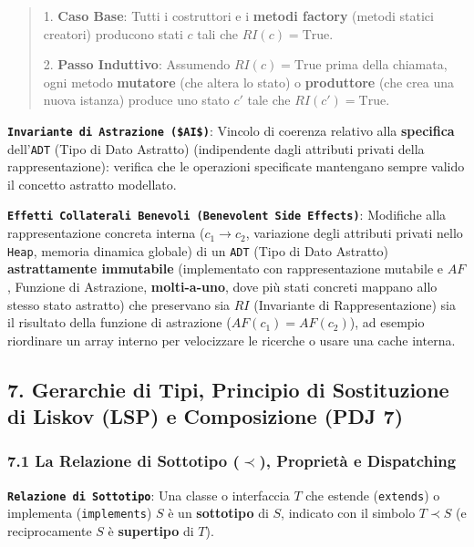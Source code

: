 \begin{quote}\small



1. \textbf{Caso Base}: Tutti i costruttori e i \textbf{metodi factory} (metodi statici creatori) producono stati $c$ tali che $RI(c) = \text{True}$.

2. \textbf{Passo Induttivo}: Assumendo $RI(c) = \text{True}$ prima della chiamata, ogni metodo \textbf{mutatore} (che altera lo stato) o \textbf{produttore} (che crea una nuova istanza) produce uno stato $c'$ tale che $RI(c') = \text{True}$.

\end{quote}

\textbf{\texttt{Invariante di Astrazione (\$AI\$)}}: Vincolo di coerenza relativo alla \textbf{specifica} dell'\texttt{ADT} (Tipo di Dato Astratto) (indipendente dagli attributi privati della rappresentazione): verifica che le operazioni specificate mantengano sempre valido il concetto astratto modellato.

\textbf{\texttt{Effetti Collaterali Benevoli (Benevolent Side Effects)}}: Modifiche alla rappresentazione concreta interna ($c_1 \to c_2$, variazione degli attributi privati nello \texttt{Heap}, memoria dinamica globale) di un \texttt{ADT} (Tipo di Dato Astratto) \textbf{astrattamente immutabile} (implementato con rappresentazione mutabile e $AF$, Funzione di Astrazione, \textbf{molti-a-uno}, dove più stati concreti mappano allo stesso stato astratto) che preservano sia $RI$ (Invariante di Rappresentazione) sia il risultato della funzione di astrazione ($AF(c_1) = AF(c_2)$), ad esempio riordinare un array interno per velocizzare le ricerche o usare una cache interna.

\subsection{7. Gerarchie di Tipi, Principio di Sostituzione di Liskov (LSP) e Composizione (PDJ 7)}\label{7-gerarchie-di-tipi-principio-di-sostituzione-di-liskov-lsp-e-composizione-pdj-7}

\subsubsection{7.1 La Relazione di Sottotipo \texorpdfstring{($\prec$)}{(sottotipo)}, Proprietà e Dispatching}\label{7-1-la-relazione-di-sottotipo-prec-proprieta-e-dispatching}

\textbf{\texttt{Relazione di Sottotipo}}: Una classe o interfaccia $T$ che estende (\texttt{extends}) o implementa (\texttt{implements}) $S$ è un \textbf{sottotipo} di $S$, indicato con il simbolo $T \prec S$ (e reciprocamente $S$ è \textbf{supertipo} di $T$).

